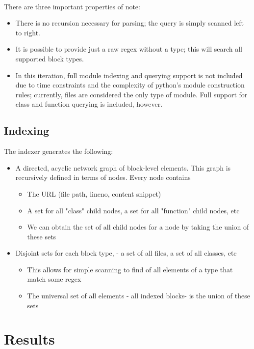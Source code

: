 \documentclass{article}
\begin{document}
\paragraph{}
There are three important properties of note:
	\begin{itemize}
    \item There is no recursion necessary for parsing; the query is simply scanned left to right.
   	\item It is possible to provide just a raw regex without a type; this will search all supported block types.
    \item In this iteration, full module indexing and querying support is not included due to time constraints and the complexity of python's module construction rules; currently, files are considered the only type of module. Full support for class and function querying is included, however.
	\end{itemize}
	
\subsection{Indexing}
The indexer generates the following:
	\begin{itemize}
	\item A directed, acyclic network graph of block-level elements. This graph is recursively defined in terms of nodes. Every node contains
       \begin{itemize} 
       	\item The URL (file path, lineno, content snippet)
        \item A set for all "class" child nodes, a set for all "function" child nodes, etc
        \item We can obtain the set of all child nodes for a node by taking the union of these sets
       \end{itemize}
    \item Disjoint sets for each block type, - a set of all files, a set of all classes, etc
    	\begin{itemize}
    	\item This allows for simple scanning to find of all elements of a type that match some regex
    	\item The universal set of all elements - all indexed blocks- is the union of these sets
    	\end{itemize}
	\end{itemize}

\section{Results}
\end{document}
